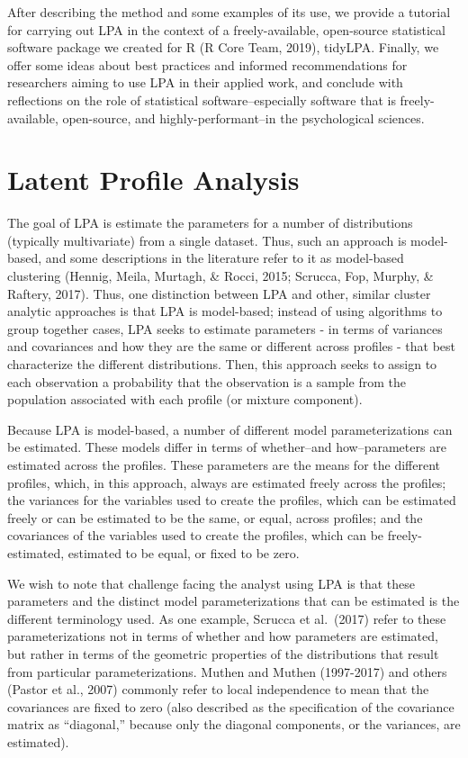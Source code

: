 \documentclass[
  english,
  man]{apa6}
\begin{document}
After describing the method and some examples of its use, we provide a tutorial
for carrying out LPA in the context of a freely-available, open-source
statistical software package we created for R (R Core Team, 2019), tidyLPA.
Finally, we offer some ideas about best practices and informed recommendations
for researchers aiming to use LPA in their applied work, and conclude with
reflections on the role of statistical software--especially software that is
freely-available, open-source, and highly-performant--in the psychological
sciences.

\hypertarget{latent-profile-analysis}{%
\section{Latent Profile Analysis}\label{latent-profile-analysis}}

The goal of LPA is estimate the parameters for a number of distributions
(typically multivariate) from a single dataset. Thus, such an approach is
model-based, and some descriptions in the literature refer to it as model-based
clustering (Hennig, Meila, Murtagh, \& Rocci, 2015; Scrucca, Fop, Murphy, \&
Raftery, 2017). Thus, one distinction between LPA and other, similar cluster
analytic approaches is that LPA is model-based; instead of using algorithms to
group together cases, LPA seeks to estimate parameters - in terms of variances
and covariances and how they are the same or different across profiles - that
best characterize the different distributions. Then, this approach seeks to
assign to each observation a probability that the observation is a sample from
the population associated with each profile (or mixture component).

Because LPA is model-based, a number of different model parameterizations can be
estimated. These models differ in terms of whether--and how--parameters are
estimated across the profiles. These parameters are the means for the different
profiles, which, in this approach, always are estimated freely across the
profiles; the variances for the variables used to create the profiles, which can
be estimated freely or can be estimated to be the same, or equal, across
profiles; and the covariances of the variables used to create the profiles,
which can be freely-estimated, estimated to be equal, or fixed to be zero.

We wish to note that challenge facing the analyst using LPA is that these
parameters and the distinct model parameterizations that can be estimated is the
different terminology used. As one example, Scrucca et al.~(2017) refer to these
parameterizations not in terms of whether and how parameters are estimated, but
rather in terms of the geometric properties of the distributions that result
from particular parameterizations. Muthen and Muthen (1997-2017) and others
(Pastor et al., 2007) commonly refer to local independence to mean that the
covariances are fixed to zero (also described as the specification of the
covariance matrix as \enquote{diagonal,} because only the diagonal components, or the
variances, are estimated).
\end{document}
